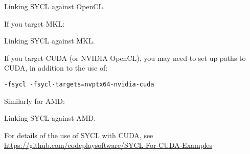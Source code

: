 \raggedbottom
\begin{codebox}[]{}
\footnotesize Linking SYCL against OpenCL.
\tcblower
{}
\end{codebox}

If you target MKL:

\raggedbottom
\begin{codebox}[]{}
\footnotesize Linking SYCL against MKL.
\tcblower
{}
\end{codebox}

If you target CUDA (or NVIDIA OpenCL), you may need to set up paths to CUDA, in addition to the use of:

\begin{verbatim}
-fsycl -fsycl-targets=nvptx64-nvidia-cuda
\end{verbatim}

Similarly for AMD:

\raggedbottom
\begin{codebox}[]{}
\footnotesize Linking SYCL against AMD.
\tcblower
{}
\end{codebox}

For details of the use of SYCL with CUDA, see \url{https://github.com/codeplaysoftware/SYCL-For-CUDA-Examples}
